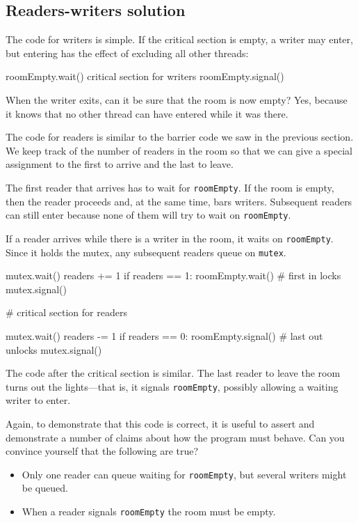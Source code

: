\documentclass{book}
\begin{document}
\subsection {Readers-writers solution}

The code for writers is simple.  If the critical section
is empty, a writer may enter, but entering has the effect
of excluding all other threads:

\begin{unbreakable}[title={Writers solution}]{}
roomEmpty.wait()
    critical section for writers
roomEmpty.signal()
\end{unbreakable}

When the writer exits, can it be sure that the room is
now empty?  Yes, because it knows that no other thread can
have entered while it was there.

The code for readers is similar to the barrier code we
saw in the previous section.  We keep track of the number
of readers in the room so that we can give a special assignment
to the first to arrive and the last to leave.

The first reader that arrives has to wait for {\tt roomEmpty}.
If the room is empty, then the reader proceeds and, at the
same time, bars writers.  Subsequent readers can still enter
because none of them will try to wait on {\tt roomEmpty}.

If a reader arrives while there is a writer in the room,
it waits on {\tt roomEmpty}.  Since it holds the mutex, any
subsequent readers queue on {\tt mutex}.


\begin{unbreakable}[title={Readers solution}]{}
mutex.wait()
readers += 1
if readers == 1:
  roomEmpty.wait()     # first in locks
mutex.signal()

# critical section for readers

mutex.wait()
readers -= 1
if readers == 0:
  roomEmpty.signal()   # last out unlocks
mutex.signal()
\end{unbreakable}

The code after the critical section is similar.  The last reader
to leave the room turns out the lights---that is, it signals
    {\tt roomEmpty}, possibly allowing a waiting writer to enter.

Again, to demonstrate that this code is correct, it is useful
to assert and demonstrate a number of claims about how the program
must behave.  Can you convince yourself that the following are
true?

\begin{itemize}

    \item Only one reader can queue waiting for {\tt roomEmpty},
          but several writers might be queued.

    \item When a reader signals {\tt roomEmpty} the room must
          be empty.

\end{itemize}
\end{document}
